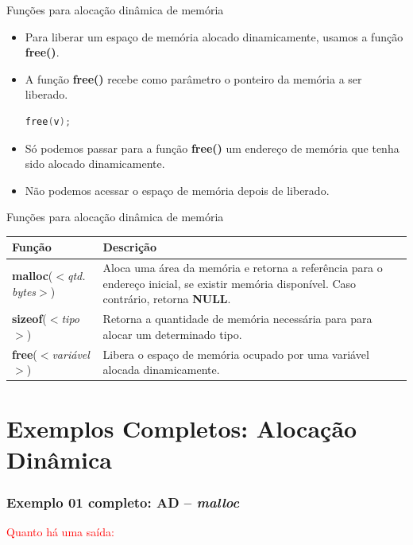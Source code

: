 \begin{frame}[fragile,c]{Funções para alocação dinâmica de memória}
  \begin{itemize}[<+->]
    \item Para liberar um espaço de memória alocado dinamicamente, usamos a função \textbf{free()}.
    \item A função \textbf{free()} recebe como parâmetro o ponteiro da memória a ser liberado.
\begin{lstlisting}[language=C]
free(v);
\end{lstlisting}
    \item Só podemos passar para a função \textbf{free()} um endereço de memória que tenha sido alocado dinamicamente.
    \item Não podemos acessar o espaço de memória depois de liberado.
  \end{itemize}  
\end{frame}

\begin{frame}[fragile,c]{Funções para alocação dinâmica de memória}
  \begin{table}
   \centering
    \begin{tabular}{p{4cm}p{6cm}}
      \hline \textbf{Função} & \textbf{Descrição} \\
      \hline  \textbf{malloc}(\textit{$<$qtd. bytes$>$}) & Aloca uma área da memória e retorna a referência para o endereço inicial, se existir memória disponível. Caso contrário, retorna \textbf{NULL}.  \\
      \hline \textbf{sizeof}(\textit{$<$tipo$>$})  & Retorna a quantidade de memória necessária para para alocar um determinado tipo.\\
      \hline \textbf{free}(\textit{$<$variável$>$})  & Libera o espaço de memória ocupado por uma variável alocada dinamicamente.\\
      \hline
    \end{tabular}
  \end{table} 
\end{frame}

\section{Exemplos Completos: Alocação Dinâmica}

\begin{frame}[allowframebreaks=0.9, c]

\frametitle{Exemplo 01 completo: AD -- \textit{malloc}}



\pause
\textcolor{red}{Quanto há uma saída:}
\end{frame}

